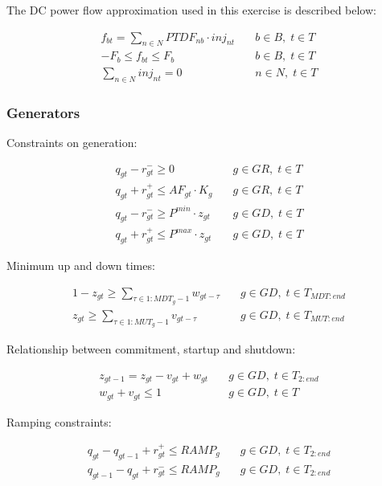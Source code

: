 \documentclass[number,times]{elsarticle}
\begin{document}
The DC power flow approximation used in this exercise is described below:

\begin{align}
    f_{bt} = \sum_{n \in N} PTDF_{nb} \cdot inj_{nt} & \quad b \in B, \; t \in T \\
    -F_b \leq f_{bt} \leq F_b                        & \quad b \in B, \; t \in T \\
    \sum_{n \in N} inj_{nt} = 0                      & \quad n \in N, \; t \in T
\end{align}

\subsubsection{Generators}

Constraints on generation:

\begin{align}
    q_{gt} - r^{-}_{gt} \geq 0                    & \quad g \in GR, \; t \in T \\
    q_{gt} + r^{+}_{gt} \leq AF_{gt} \cdot K_g    & \quad g \in GR, \; t \in T \\
    q_{gt} - r^{-}_{gt} \geq P^{min} \cdot z_{gt} & \quad g \in GD, \; t \in T \\
    q_{gt} + r^{+}_{gt} \leq P^{max} \cdot z_{gt} & \quad g \in GD, \; t \in T
\end{align}

Minimum up and down times:

\begin{align}
    1 - z_{gt} \geq \sum_{\tau \in 1:MDT_g - 1} w_{gt-\tau} & \quad g \in GD, \; t \in T_{MDT:end} \\
    z_{gt} \geq \sum_{\tau \in 1:MUT_g - 1} v_{gt-\tau}     & \quad g \in GD, \; t \in T_{MUT:end}
\end{align}

Relationship between commitment, startup and shutdown:

\begin{align}
    z_{gt-1} = z_{gt} - v_{gt} + w_{gt} & \quad g \in GD, \; t \in T_{2:end} \\
    w_{gt} + v_{gt} \leq 1              & \quad g \in GD, \; t \in T
\end{align}

Ramping constraints:

\begin{align}
    q_{gt} - q_{gt-1} + r^+_{gt} \leq RAMP_g & \quad g \in GD, \; t \in T_{2:end} \\
    q_{gt-1} - q_{gt} + r^-_{gt} \leq RAMP_g & \quad g \in GD, \; t \in T_{2:end}
\end{align}
\end{document}
